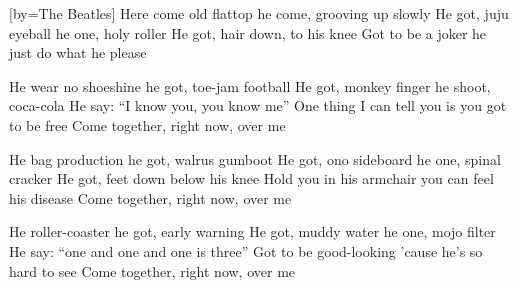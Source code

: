 [by={The Beatles}]
\beginverse
Here come old flattop he come, grooving up slowly
He got, juju eyeball he one, holy roller
He got, hair down, to his knee
Got to be a joker he just do what he please
\endverse

\beginverse
He wear no shoeshine he got, toe-jam football
He got, monkey finger he shoot, coca-cola
He say: ``I know you, you know me''
One thing I can tell you is you got to be free
Come together, right now, over me
\endverse

\beginverse
He bag production he got, walrus gumboot
He got, ono sideboard he one, spinal cracker
He got, feet down below his knee
Hold you in his armchair you can feel his disease
Come together, right now, over me
\endverse

\beginverse
He roller-coaster he got, early warning
He got, muddy water he one, mojo filter
He say: ``one and one and one is three''
Got to be good-looking 'cause he's so hard to see
Come together, right now, over me
\endverse
\endsong